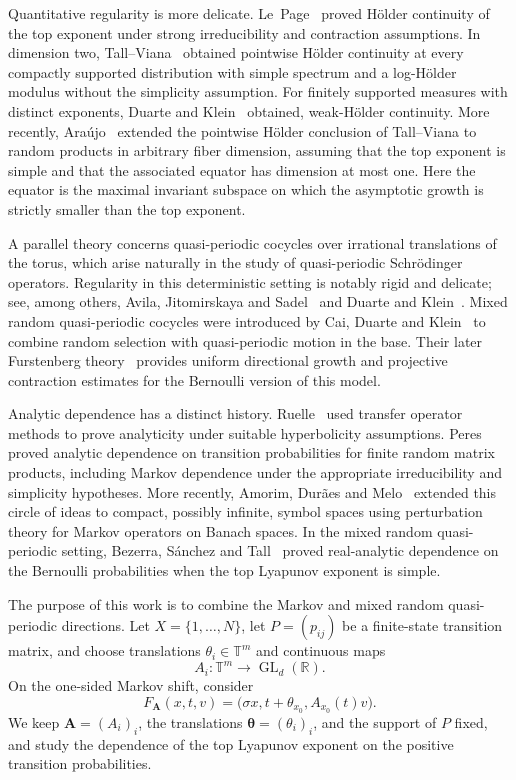 \documentclass[11pt,a4paper]{amsart}
\newcommand{\T}{\mathbb T}
\newcommand{\R}{\mathbb R}
\begin{document}
Quantitative regularity is more delicate.  Le~Page~\cite{LePage}
proved Hölder continuity of the top exponent under strong
irreducibility and contraction assumptions.  In dimension two,
Tall--Viana~\cite{TV20} obtained pointwise Hölder continuity at every
compactly supported distribution with simple spectrum and a
log-Hölder modulus without the simplicity assumption. For finitely
supported measures with distinct exponents, Duarte and Klein~\cite{DK20} obtained, weak-Hölder continuity. More recently, Araújo~\cite{Araujo26} extended the pointwise Hölder conclusion of
Tall--Viana to random products in arbitrary fiber dimension, assuming
that the top exponent is simple and that the associated equator has dimension at most one.  Here the equator is the maximal invariant subspace on which the asymptotic growth is strictly smaller than the top exponent.

A parallel theory concerns quasi-periodic cocycles over irrational
translations of the torus, which arise naturally in the study of
quasi-periodic Schrödinger operators.  Regularity in this deterministic
setting is notably rigid and delicate; see, among others,
Avila, Jitomirskaya and Sadel~\cite{AJS14} and
Duarte and Klein~\cite{DK14,DK19}.  Mixed random quasi-periodic cocycles
were introduced by Cai, Duarte and Klein~\cite{CDKMixed} to combine
random selection with quasi-periodic motion in the base.  Their later
Furstenberg theory~\cite{CDK} provides uniform directional growth and
projective contraction estimates for the Bernoulli version of this
model.

Analytic dependence has a distinct history.  Ruelle~\cite{Ruelle}
used transfer operator methods to prove analyticity under suitable
hyperbolicity assumptions.  Peres~\cite{Peres} proved analytic
dependence on transition probabilities for finite random matrix
products, including Markov dependence under the appropriate
irreducibility and simplicity hypotheses.  More recently,
Amorim, Durães and Melo~\cite{ADM26} extended this circle of ideas to
compact, possibly infinite, symbol spaces using perturbation theory
for Markov operators on Banach spaces.  In the mixed
random quasi-periodic setting, Bezerra, Sánchez and Tall~\cite{BST}
proved real-analytic dependence on the Bernoulli probabilities when
the top Lyapunov exponent is simple.

The purpose of this work is to combine the Markov and mixed
random quasi-periodic directions.  Let \(X=\{1,\dots,N\}\), let
\(P=(p_{ij})\) be a finite-state transition matrix, and choose
translations \(\theta_i\in\T^m\) and continuous maps
\[
 A_i:\T^m\longrightarrow\operatorname{GL}_d(\R).
\]
On the one-sided Markov shift, consider
\[
 F_{\mathbf A}(x,t,v)
 =\bigl(\sigma x,t+\theta_{x_0},A_{x_0}(t)v\bigr).
\]
We keep \(\mathbf A=(A_i)_i\), the translations
\(\boldsymbol\theta=(\theta_i)_i\), and the support of \(P\) fixed,
and study the dependence of the top Lyapunov exponent on the positive
transition probabilities.
\end{document}
